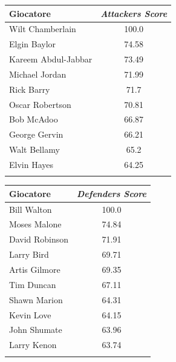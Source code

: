 \documentclass[10pt,a4paper,twocolumn]{article}
\begin{document}
\begin{table}[t]
{\begin{tabular}{lc}
	\end{tabular}}
	
	\parbox{.45\linewidth}{
		\begin{tabular}{lc}
			Giocatore & \textit{Attackers Score}  \\
			\hline
			Wilt Chamberlain & 100.0\\
			Elgin Baylor & 74.58\\
			Kareem Abdul-Jabbar & 73.49\\
			Michael Jordan & 71.99\\
			Rick Barry & 71.7\\
			Oscar Robertson & 70.81\\
			Bob McAdoo & 66.87\\
			George Gervin & 66.21\\
			Walt Bellamy & 65.2\\
			Elvin Hayes & 64.25\\
			&\\
			
		\end{tabular}
	}
	\quad
	\hspace{19pt}
	\parbox{.45\linewidth}{
		\begin{tabular}{lc}
			Giocatore & \textit{Defenders Score}  \\
			\hline
			Bill Walton & 100.0\\
			Moses Malone & 74.84\\
			David Robinson & 71.91\\
			Larry Bird & 69.71\\
			Artis Gilmore & 69.35\\
			Tim Duncan & 67.11\\
			Shawn Marion & 64.31\\
			Kevin Love & 64.15\\
			John Shumate & 63.96\\
			Larry Kenon & 63.74\\
			&\\
			
	\end{tabular}}
	
\end{table}
\end{document}

